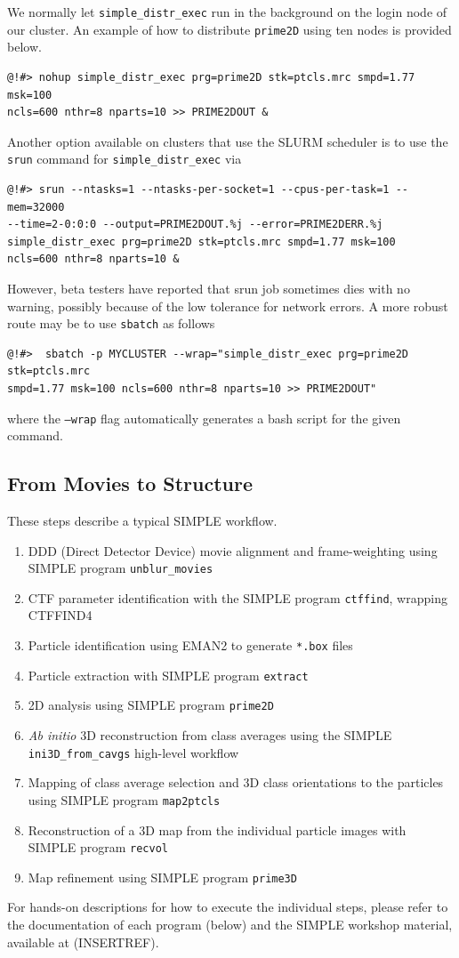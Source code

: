 \documentclass[a4paper,11pt]{article}
\newcommand{\prgname}[1]{\textcolor{NavyBlue}{\texttt{#1}}}
\begin{document}
We normally let \prgname{simple\_distr\_exec} run in the background on the login node of our cluster. An example of how to distribute \prgname{prime2D} using ten nodes is provided below.
\begin{verbatim}
@!#> nohup simple_distr_exec prg=prime2D stk=ptcls.mrc smpd=1.77 msk=100
ncls=600 nthr=8 nparts=10 >> PRIME2DOUT &
\end{verbatim}
Another option available on clusters that use the SLURM scheduler is to use the \texttt{srun} command for \prgname{simple\_distr\_exec} via
\begin{verbatim}
@!#> srun --ntasks=1 --ntasks-per-socket=1 --cpus-per-task=1 --mem=32000 
--time=2-0:0:0 --output=PRIME2DOUT.%j --error=PRIME2DERR.%j
simple_distr_exec prg=prime2D stk=ptcls.mrc smpd=1.77 msk=100
ncls=600 nthr=8 nparts=10 &
\end{verbatim}
However, beta testers have reported that srun job sometimes dies with no warning, possibly because of the low tolerance for network errors. A more robust route may be to use \texttt{sbatch} as follows
\begin{verbatim}
@!#>  sbatch -p MYCLUSTER --wrap="simple_distr_exec prg=prime2D stk=ptcls.mrc 
smpd=1.77 msk=100 ncls=600 nthr=8 nparts=10 >> PRIME2DOUT"
\end{verbatim}
where the \texttt{--wrap} flag automatically generates a bash script for the given command.

\subsection{From Movies to Structure}
These steps describe a typical SIMPLE workflow.
\begin{enumerate}
\item DDD (Direct Detector Device) movie alignment and frame-weighting using SIMPLE program \prgname{unblur\_movies}
\item CTF parameter identification with the SIMPLE program \prgname{ctffind}, wrapping CTFFIND4 \citep{rohou2015ctffind4}
\item Particle identification using EMAN2 \citep{Tang:2007aa} to generate \texttt{*.box} files
\item Particle extraction with SIMPLE program \prgname{extract}
\item 2D analysis using SIMPLE program \prgname{prime2D}
\item \textit{Ab initio} 3D reconstruction from class averages using the SIMPLE \prgname{ini3D\_from\_cavgs} high-level workflow
\item Mapping of class average selection and 3D class orientations to the particles using SIMPLE program \prgname{map2ptcls}
\item Reconstruction of a 3D map from the individual particle images with SIMPLE program \prgname{recvol}
\item Map refinement using SIMPLE program \prgname{prime3D}
\end{enumerate}
For hands-on descriptions for how to execute the individual steps, please refer to the documentation of each program (below) and the SIMPLE workshop material, available at (INSERTREF).
\end{document}
